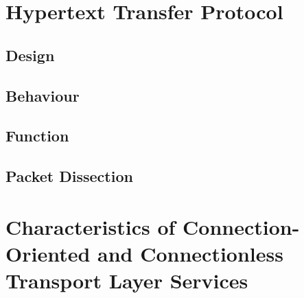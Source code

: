 \documentclass[10pt]{report}
\begin{document}
\chapter{Hypertext Transfer Protocol}

\section{Design}
\section{Behaviour}
\section{Function}
\section{Packet Dissection}



\chapter{Characteristics of Connection-Oriented and Connectionless Transport
	Layer Services}



%
%


\end{document}

